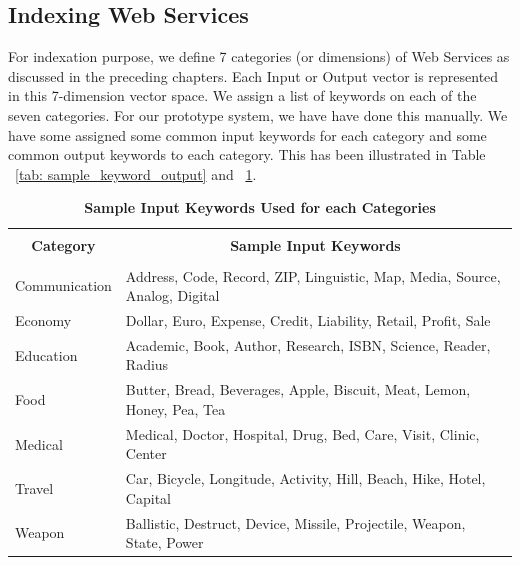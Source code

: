 \documentclass[12pt, twoside]{book}
\begin{document}
\subsection{Indexing Web Services}
For indexation purpose, we define 7 categories (or dimensions) of Web Services as discussed in the preceding chapters. Each Input or Output vector is represented in this 7-dimension vector space. We assign a list of keywords on each of the seven categories. For our prototype system, we have have done this manually. We have some assigned some common input keywords for each category and some common output keywords to each category. This has been illustrated in Table ~\ref{tab: sample_keyword_output} and ~\ref{tab: sample_keyword_input}.

\begin{table}[h]
	\begin{center}
		\caption{\textbf{Sample Input Keywords Used for each Categories}}
		\label{tab: sample_keyword_input}
		\begin{tabular}{| p{} | p{} |}
			\hline
			\multicolumn{1}{|c|}{} & \multicolumn{1}{c|}{} \\
			\multicolumn{1}{|c|}{\textbf{Category}} & \multicolumn{1}{c|}{\textbf{Sample Input Keywords}} \\
			\multicolumn{1}{|c|}{} & \multicolumn{1}{c|}{} \\
			\hline
			Communication & Address, Code, Record, ZIP, Linguistic, Map, Media, Source, Analog, Digital \\ \hline
			Economy &  Dollar, Euro, Expense, Credit, Liability, Retail, Profit, Sale\\ \hline
			Education & Academic, Book, Author, Research, ISBN, Science, Reader, Radius\\ \hline
			Food & Butter, Bread, Beverages, Apple, Biscuit, Meat, Lemon, Honey, Pea, Tea\\ \hline
			Medical & Medical, Doctor, Hospital, Drug, Bed, Care, Visit, Clinic, Center\\ \hline
			Travel & Car, Bicycle, Longitude, Activity, Hill, Beach, Hike, Hotel, Capital\\ \hline
			Weapon & Ballistic, Destruct, Device, Missile, Projectile, Weapon, State, Power\\ \hline
		\end{tabular}
	\end{center}
\end{table}
\end{document}
